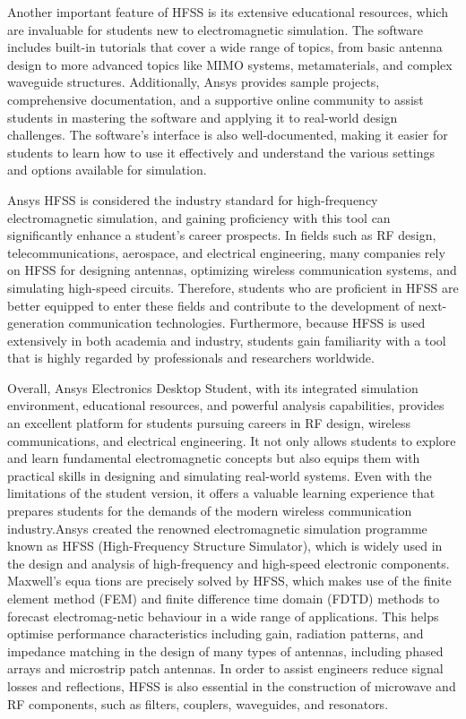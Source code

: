 \documentclass[12pt]{article}
\begin{document}
\par Another important feature of HFSS is its extensive educational resources, which are invaluable for students new to electromagnetic simulation. The software
includes built-in tutorials that cover a wide range of topics, from basic antenna design to more advanced topics like MIMO systems, metamaterials, and complex
waveguide structures. Additionally, Ansys provides sample projects, comprehensive documentation, and a supportive online community to assist students in mastering
the software and applying it to real-world design challenges. The software’s interface is also well-documented, making it easier for students to learn how to
use it effectively and understand the various settings and options available for simulation.\\

\par Ansys HFSS is considered the industry standard for high-frequency electromagnetic simulation, and gaining proficiency with this tool can significantly enhance
a student’s career prospects. In fields such as RF design, telecommunications, aerospace, and electrical engineering, many companies rely on HFSS for designing antennas, optimizing wireless communication systems, and simulating high-speed circuits. Therefore, students who are proficient in HFSS are better equipped to enter these fields and contribute to the development of next-generation communication technologies. Furthermore, because HFSS is used extensively in both academia and industry, students gain familiarity with a tool that is highly regarded
by professionals and researchers worldwide.\\

\par Overall, Ansys Electronics Desktop Student, with its integrated simulation environment, educational resources, and powerful analysis capabilities, provides an excellent platform for students pursuing careers in RF design, wireless communications, and electrical engineering. It not only allows students to explore and learn fundamental electromagnetic concepts but also equips them with practical
skills in designing and simulating real-world systems. Even with the limitations of the student version, it offers a valuable learning experience that prepares students
for the demands of the modern wireless communication industry.Ansys created the renowned electromagnetic simulation programme known as HFSS (High-Frequency Structure Simulator), which is widely used in the design and analysis of high-frequency and high-speed electronic components. Maxwell’s equa tions are precisely solved by HFSS, which makes use of the finite element method (FEM)
and finite difference time domain (FDTD) methods to forecast electromag-netic behaviour in a wide range of applications. This helps optimise performance characteristics including gain, radiation patterns, and impedance matching in the design of many types of antennas, including phased arrays and microstrip patch antennas.
In order to assist engineers reduce signal losses and reflections, HFSS is also essential in the construction of microwave and RF components, such as filters, couplers, waveguides, and resonators.\\
\end{document}
